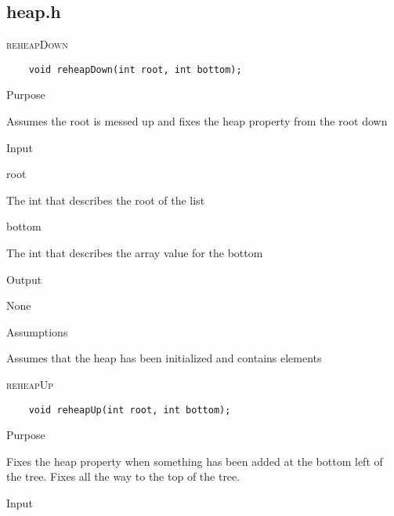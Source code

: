 \documentclass[pdftex, 12pt]{article}
\begin{document}
\subsection{heap.h}
\begin{description}

	\item{\textsc{reheapDown}}
\begin{lstlisting}
	void reheapDown(int root, int bottom);
\end{lstlisting}
		\begin{description}

			\item{Purpose}

				Assumes the root is messed up and fixes the heap property from the root down

			\item{Input}

				\begin{description}

					\item{root}
							
						The int that describes the root of the list

					\item{bottom}

						The int that describes the array value for the bottom

				\end{description}

			\item{Output}

				None

			\item{Assumptions}

				Assumes that the heap has been initialized and contains elements

		\end{description}
	\item{\textsc{reheapUp}}
\begin{lstlisting}
	void reheapUp(int root, int bottom);
\end{lstlisting}
		\begin{description}

			\item{Purpose}

				Fixes the heap property when something has been added at the bottom left of the tree. Fixes all the way
				to the top of the tree.

			\item{Input}


\end{description}
\end{description}
\end{document}
